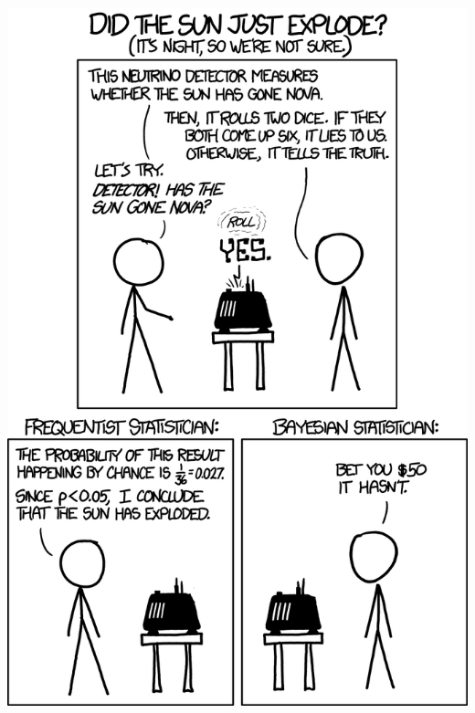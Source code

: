 \documentclass[
  ignorenonframetext,
  aspectratio=169]{beamer}
\begin{document}
\begin{frame}
\begin{center}\includegraphics[width=13in]{img/frequentists_vs_bayesians_2x} \end{center}
\end{frame}
\end{document}
